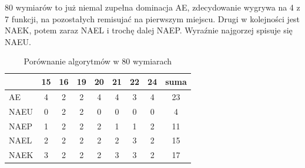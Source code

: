 \documentclass[12pt, a4paper]{article}
\begin{document}
80 wymiarów to już niemal zupełna dominacja AE, zdecydowanie wygrywa na 4 z 7 funkcji,
na pozostałych remisujać na pierwszym miejscu. Drugi w kolejności jest NAEK, potem zaraz NAEL
i trochę dalej NAEP. Wyraźnie najgorzej spisuje się NAEU.

\begin{table}[H]
\centering
\begin{tabular}{ l | c | c | c | c | c | c | c | c}
         & 15  & 16 & 19 & 20 & 21 & 22 & 24 & suma \\ \hline
AE       & 4   & 2  & 2  & 4  & 4  & 3  & 4  & 23   \\ 
NAEU     & 0   & 2  & 2  & 0  & 0  & 0  & 0  & 4    \\ 
NAEP     & 1   & 2  & 2  & 2  & 1  & 1  & 2  & 11   \\ 
NAEL     & 2   & 2  & 2  & 2  & 2  & 3  & 2  & 15   \\
NAEK     & 3   & 2  & 2  & 2  & 3  & 3  & 2  & 17   \\ 
\end{tabular}
\caption{Porównanie algorytmów w 80 wymiarach}
\label{table:total}
\end{table}
\end{document}

